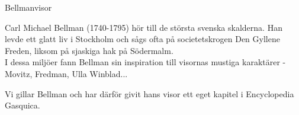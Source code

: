 \begin{flushleft}
{\Huge Bellmanvisor\\}
\vspace{1cm}
\Large {Carl Michael Bellman (1740-1795) hör till de största svenska
skalderna. Han levde ett glatt liv i Stockholm och sågs ofta
på societetskrogen Den Gyllene Freden, liksom på sjaskiga hak på
Södermalm.\\
I dessa miljöer fann Bellman sin inspiration till visornas mustiga karaktärer - Movitz, Fredman, Ulla Winblad...

Vi gillar Bellman och har därför givit hans visor ett eget kapitel i
Encyclopedia Gasquica.}
\end{flushleft}

\newpage







\newpage



\newpage




\newpage



